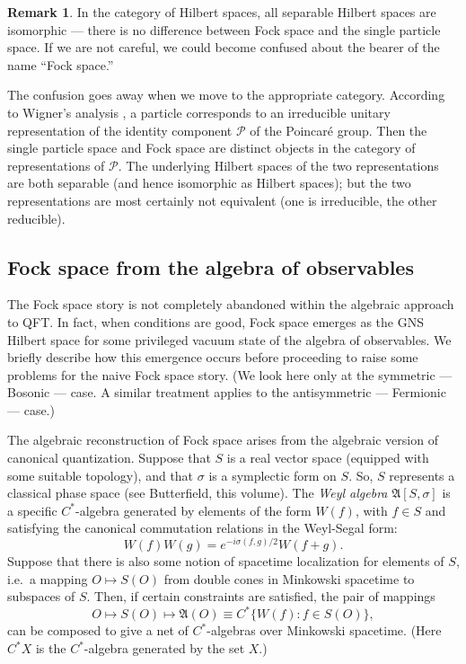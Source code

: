 \documentclass[11pt]{article}
\newcommand{\alg}[1]{\mathfrak{#1}}
\theoremstyle{definition}
\theoremstyle{definition}
\newtheorem{note}[thm]{Remark}
\theoremstyle{remark}
\def\2#1{{\mathcal #1}}
\begin{document}
\begin{note} In the category of Hilbert spaces, all separable Hilbert
  spaces are isomorphic --- there is no difference between Fock space
  and the single particle space.  If we are not careful, we could
  become confused about the bearer of the name ``Fock space.''

  The confusion goes away when we move to the appropriate category.
  According to Wigner's analysis \cite{wig}, a particle corresponds to
  an irreducible unitary representation of the identity component
  $\2P$ of the Poincar{\'e} group.  Then the single particle space and
  Fock space are distinct objects in the category of representations
  of $\2P$.  The underlying Hilbert spaces of the two representations
  are both separable (and hence isomorphic as Hilbert spaces); but the
  two representations are most certainly not equivalent (one is
  irreducible, the other reducible).
\end{note}



\subsection{Fock space from the algebra of observables}

The Fock space story is not completely abandoned within the algebraic
approach to QFT.  In fact, when conditions are good, Fock space
emerges as the GNS Hilbert space for some privileged vacuum state of
the algebra of observables.  We briefly describe how this emergence
occurs before proceeding to raise some problems for the naive Fock
space story.  (We look here only at the symmetric --- Bosonic ---
case.  A similar treatment applies to the antisymmetric --- Fermionic
--- case.)

The algebraic reconstruction of Fock space arises from
the algebraic version of canonical quantization.
Suppose that $S$ is a real vector space (equipped with
some suitable topology), and that $\sigma$ is a
symplectic form on $S$.  So, $S$ represents a classical
phase space (see Butterfield, this volume).  The
\emph{Weyl algebra} $\alg{A}[S,\sigma ]$ is a specific
$C^*$-algebra generated by elements of the form $W(f)$,
with $f\in S$ and satisfying the canonical commutation
relations in the Weyl-Segal form:
$$ W(f)W(g)=e^{-i\sigma (f,g)/2}W(f+g) .$$ 
Suppose that there is also some notion of spacetime localization for
elements of $S$, i.e.\ a mapping $O\mapsto S(O)$ from double cones in
Minkowski spacetime to subspaces of $S$.  Then, if certain constraints
are satisfied, the pair of mappings
$$ O\mapsto S(O)\mapsto \alg{A}(O)\equiv C^*\{ W(f):f\in S(O) \} ,$$ 
can be composed to give a net of $C^*$-algebras over Minkowski
spacetime. (Here $C^*X$ is the $C^*$-algebra generated by the set
$X$.)
\end{document}
